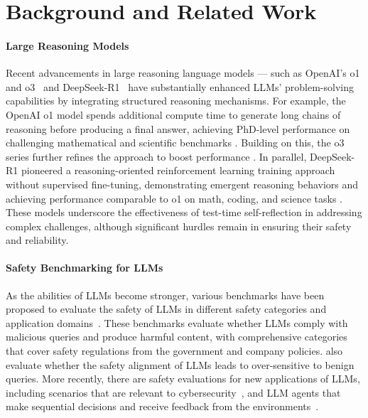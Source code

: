 \section{Background and Related Work}
\paragraph{Large Reasoning Models} 
Recent advancements in large reasoning language models — such as OpenAI’s o1 and o3~\cite{o1card,o3minicard} and DeepSeek-R1~\cite{guo2025deepseek} have substantially enhanced LLMs’ problem-solving capabilities by integrating structured reasoning mechanisms. For example, the OpenAI o1 model spends additional compute time to generate long chains of reasoning before producing a final answer, achieving PhD-level performance on challenging mathematical and scientific benchmarks \citep{o1card}. Building on this, the o3 series further refines the approach to boost performance \citep{o3minicard}. In parallel, DeepSeek-R1 pioneered a reasoning-oriented reinforcement learning training approach without supervised fine-tuning, demonstrating emergent reasoning behaviors and achieving performance comparable to o1 on math, coding, and science tasks \cite{guo2025deepseek}. These models underscore the effectiveness of test-time self-reflection in addressing complex challenges, although significant hurdles remain in ensuring their safety and reliability.


\paragraph{Safety Benchmarking for LLMs} 
As the abilities of LLMs become stronger, various benchmarks have been proposed to evaluate the safety of LLMs in different safety categories and application domains~\cite{wang2023not,bhatt2024cyberseceval,wan2024cyberseceval,li2024salad,xie2024sorry,zeng2024air,andriushchenko2024agentharm}. 
These benchmarks evaluate whether LLMs comply with malicious queries and produce harmful content, with comprehensive categories that cover safety regulations from the government and company policies. \citet{rottger2023xstest} also evaluate whether the safety alignment of LLMs leads to over-sensitive to benign queries. 
More recently, there are safety evaluations for new applications of LLMs, including scenarios that are relevant to cybersecurity~\cite{wan2024cyberseceval,bhatt2024cyberseceval}, and LLM agents that make sequential decisions and receive feedback from the environments~\cite{andriushchenko2024agentharm}.

